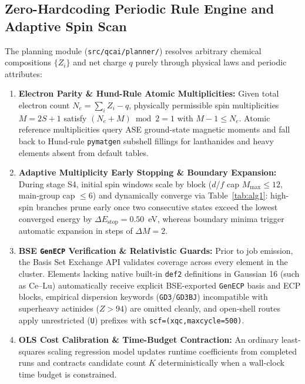 \documentclass[journal=jcisd8,manuscript=article]{achemso}
\begin{document}
\subsection{Zero-Hardcoding Periodic Rule Engine and Adaptive Spin Scan}

The planning module (\texttt{src/qcai/planner/}) resolves arbitrary chemical compositions $\{Z_i\}$ and net charge $q$ purely through physical laws and periodic attributes:
\begin{enumerate}
  \item \textbf{Electron Parity \& Hund-Rule Atomic Multiplicities:} Given total electron count $N_e = \sum_i Z_i - q$, physically permissible spin multiplicities $M = 2S + 1$ satisfy $(N_e + M) \bmod 2 = 1$ with $M - 1 \le N_e$. Atomic reference multiplicities query ASE ground-state magnetic moments and fall back to Hund-rule \texttt{pymatgen} subshell fillings for lanthanides and heavy elements absent from default tables.
  \item \textbf{Adaptive Multiplicity Early Stopping \& Boundary Expansion:} During stage S4, initial spin windows scale by block ($d$/$f$ cap $M_{\max} \le 12$, main-group cap $\le 6$) and dynamically converge via Table~\ref{tab:alg1}: high-spin branches prune early once two consecutive states exceed the lowest converged energy by $\Delta E_{\text{stop}} = 0.50$~eV, whereas boundary minima trigger automatic expansion in steps of $\Delta M = 2$.
  \item \textbf{BSE \texttt{GenECP} Verification \& Relativistic Guards:} Prior to job emission, the Basis Set Exchange\cite{pritchard2019bse} API validates coverage across every element in the cluster. Elements lacking native built-in \texttt{def2} definitions in Gaussian 16 (such as $\mathrm{Ce\text{--}Lu}$) automatically receive explicit BSE-exported \texttt{GenECP} basis and ECP blocks, empirical dispersion keywords (\texttt{GD3}/\texttt{GD3BJ}) incompatible with superheavy actinides ($Z > 94$) are omitted cleanly, and open-shell routes apply unrestricted (\texttt{U}) prefixes with \texttt{scf=(xqc,maxcycle=500)}.
  \item \textbf{OLS Cost Calibration \& Time-Budget Contraction:} An ordinary least-squares scaling regression model updates runtime coefficients from completed runs and contracts candidate count $K$ deterministically when a wall-clock time budget is constrained.
\end{enumerate}
\end{document}
